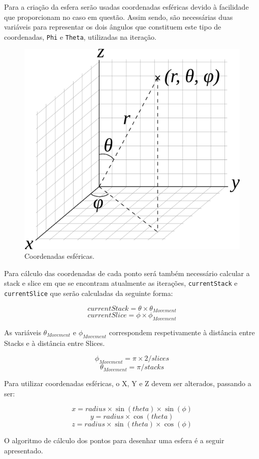\documentclass[a4paper]{article}
\begin{document}
Para a criação da esfera serão usadas coordenadas esféricas devido à facilidade que proporcionam no caso em questão. Assim sendo, são necessárias duas variáveis para representar os dois ângulos que constituem este tipo de coordenadas, \texttt{Phi} e \texttt{Theta}, utilizadas na iteração.

\begin{figure}[H]
    \centering
    \includegraphics[width=0.5\linewidth]{coords.png}
    \caption{Coordenadas esféricas.}
\end{figure}

Para cálculo das coordenadas de cada ponto será também necessário calcular a stack e slice em que se encontram atualmente as iterações, \texttt{currentStack} e \texttt{currentSlice} que serão calculadas da seguinte forma:

\[currentStack = \theta \times \theta_{Movement}\]
\[currentSlice = \phi \times \phi_{Movement}\]


As variáveis $\theta_{Movement}$ e $\phi_{Movement}$ correspondem respetivamente à distância entre Stacks e à distância entre Slices.

\[\phi_{Movement} = \pi \times 2 / slices\]
\[\theta_{Movement} = \pi / stacks\]


Para utilizar coordenadas esféricas, o X, Y e Z devem ser alterados, passando a ser:

\[x = radius \times \sin(theta) \times \sin(\phi)\]
\[y = radius \times \cos(theta)\]
\[z = radius \times \sin(theta) \times \cos(\phi)\]

O algoritmo de cálculo dos pontos para desenhar uma esfera é a seguir apresentado.
\end{document}
